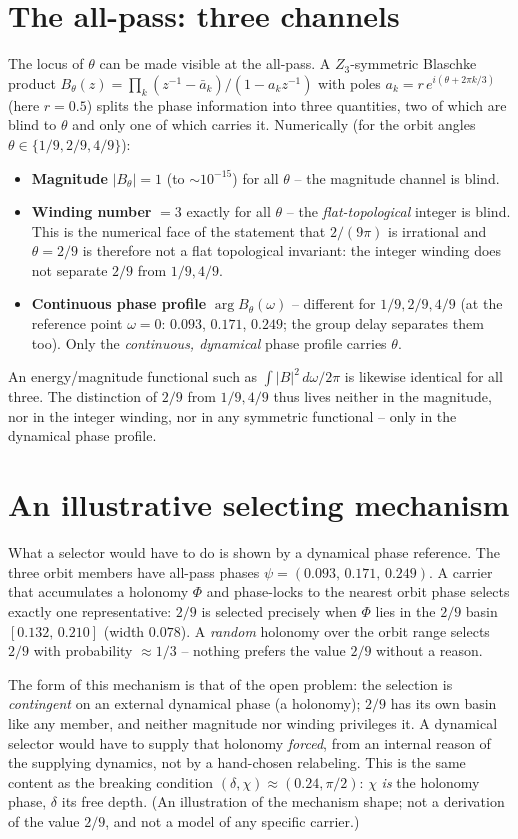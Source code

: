 \section{The all-pass: three channels}
The locus of $\theta$ can be made visible at the all-pass. A $Z_3$-symmetric Blaschke product
$B_\theta(z)=\prod_k(z^{-1}-\bar a_k)/(1-a_k z^{-1})$ with poles $a_k=r\,e^{i(\theta+2\pi k/3)}$
(here $r=0.5$) splits the phase information into three quantities, two of which are blind to
$\theta$ and only one of which carries it. Numerically (for the orbit angles
$\theta\in\{1/9,2/9,4/9\}$):
\begin{itemize}
\item \textbf{Magnitude} $|B_\theta|=1$ (to $\sim10^{-15}$) for all $\theta$ -- the magnitude
  channel is blind.
\item \textbf{Winding number} $=3$ exactly for all $\theta$ -- the \emph{flat-topological}
  integer is blind. This is the numerical face of the statement that $2/(9\pi)$ is irrational
  and $\theta=2/9$ is therefore not a flat topological invariant: the integer winding does not
  separate $2/9$ from $1/9,4/9$.
\item \textbf{Continuous phase profile} $\arg B_\theta(\omega)$ -- different for $1/9,2/9,4/9$
  (at the reference point $\omega=0$: $0.093$, $0.171$, $0.249$; the group delay separates them
  too). Only the \emph{continuous, dynamical} phase profile carries $\theta$.
\end{itemize}
An energy/magnitude functional such as $\int|B|^2\,d\omega/2\pi$ is likewise identical for all
three. The distinction of $2/9$ from $1/9,4/9$ thus lives neither in the magnitude, nor in the
integer winding, nor in any symmetric functional -- only in the dynamical phase profile.

\section{An illustrative selecting mechanism}
What a selector would have to do is shown by a dynamical phase reference. The three orbit
members have all-pass phases $\psi=(0.093,\,0.171,\,0.249)$. A carrier that accumulates a
holonomy $\Phi$ and phase-locks to the nearest orbit phase selects exactly one representative:
$2/9$ is selected precisely when $\Phi$ lies in the $2/9$ basin $[0.132,\,0.210]$ (width
$0.078$). A \emph{random} holonomy over the orbit range selects $2/9$ with probability
$\approx1/3$ -- nothing prefers the value $2/9$ without a reason.

The form of this mechanism is that of the open problem: the selection is \emph{contingent} on
an external dynamical phase (a holonomy); $2/9$ has its own basin like any member, and neither
magnitude nor winding privileges it. A dynamical selector would have to supply that holonomy
\emph{forced}, from an internal reason of the supplying dynamics, not by a hand-chosen
relabeling. This is the same
content as the breaking condition $(\delta,\chi)\approx(0.24,\pi/2)$: $\chi$ \emph{is} the
holonomy phase, $\delta$ its free depth. (An illustration of the mechanism shape; not a
derivation of the value $2/9$, and not a model of any specific carrier.)

